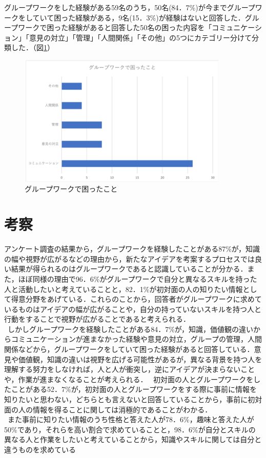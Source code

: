 \documentclass{funthesis}
\begin{document}
グループワークをした経験がある59名のうち，50名(84．7\%)が今までグループワークをしていて困った経験がある，9名(15．3\%)が経験はないと回答した．グループワークで困った経験があると回答した50名の困った内容を「コミュニケーション」「意見の対立」「管理」「人間関係」「その他」の5つにカテゴリー分けて分類した．（図\ref{graph4}）

\begin{figure}[H]
 \centering
   \includegraphics[width=100mm]{figures/graph4.png}
 \caption{グループワークで困ったこと}
 \label{graph4}
\end{figure}


\section{考察}

アンケート調査の結果から，グループワークを経験したことがある87\%が，知識の幅や視野が広がるなどの理由から，新たなアイデアを考案するプロセスでは良い結果が得られるのはグループワークであると認識していることが分かる．また，ほぼ同様の理由で96．6\%がグループワークで自分と異なるスキルを持った人と活動したいと考えていることと，82．1\%が初対面の人の知りたい情報として得意分野をあげている．これらのことから，回答者がグループワークに求めているものはアイデアの幅が広がることや，自分の持っていないスキルを持つ人と行動をすることで視野が広がることであると考えられる．\\
\ しかしグループワークを経験したことがある84．7\%が，知識，価値観の違いからコミュニケーションが進まなかった経験や意見の対立，グループの管理，人間関係などから，グループワークをしていて困った経験があると回答している．意見や価値観，知識の違いは視野を広げる可能性があるが，異なる背景を持つ人を理解する努力をしなければ，人と人が衝突し，逆にアイデアが決まらないことや，作業が進まなくなることが考えられる．
\ 初対面の人とグループワークをしたことがある52．7\%が，初対面の人とグループワークをする際に事前に情報を知りたいと思わない，どちらとも言えないと回答していることから，事前に初対面の人の情報を得ることに関しては消極的であることがわかる．\\
\ また事前に知りたい情報のうち性格と答えた人が78．6\%，趣味と答えた人が50\%であり，それらを高い割合で求めていることと，98．6\%が自分とスキルの異なる人と作業をしたいと考えていることから，知識やスキルに関しては自分と違うものを求めている
\end{document}
